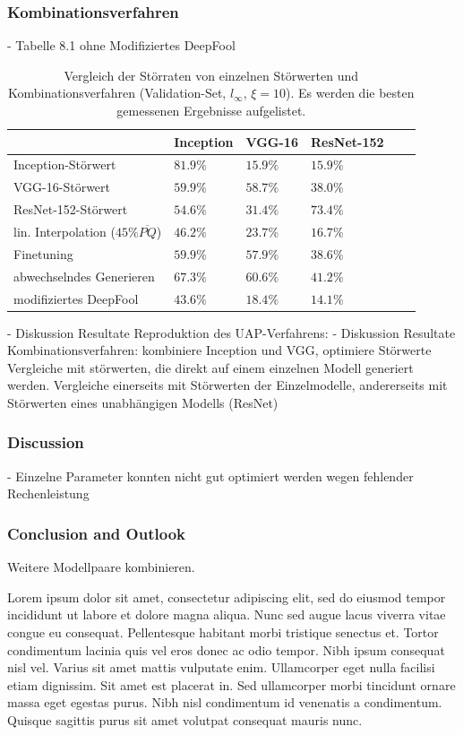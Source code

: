 \documentclass[runningheads]{llncs}
\begin{document}
\subsubsection{Kombinationsverfahren}
- Tabelle	8.1 ohne Modifiziertes DeepFool
\begin{table}[]
\centering
\caption{Vergleich der Störraten von einzelnen Störwerten und Kombinationsverfahren (Validation-Set, $l_\infty$, $\xi=10$). Es werden die besten gemessenen Ergebnisse aufgelistet.}
\begin{tabular}{|l|l|l|l|l|l|}
\hline

											&	Inception	&	VGG-16		&	ResNet-152		\\ \hline
Inception-Störwert							&	$81.9\%$		&	$15.9\%$	&	$15.9\%$		\\
VGG-16-Störwert								&	$59.9\%$		&	$58.7\%$	&	$38.0\%$		\\
ResNet-152-Störwert							&	$54.6\%$		&	$31.4\%$	&	$73.4\%$		\\ \hline
lin. Interpolation ($45\% \overline{PQ}$)	&	$46.2\%$		&	$23.7\%$	&	$16.7\%$		\\
Finetuning									&	$59.9\%$		&	$57.9\%$	&	$38.6\%$		\\
abwechselndes Generieren						&	$67.3\%$		&	$60.6\%$	&	$41.2\%$		\\
modifiziertes DeepFool						&	$43.6\%$		&	$18.4\%$	&	$14.1\%$		\\


\hline 
\end{tabular}
\label{tbl_vergleich_comb}
\end{table}
- Diskussion Resultate Reproduktion des UAP-Verfahrens: 
- Diskussion Resultate Kombinationsverfahren: kombiniere Inception und VGG, optimiere Störwerte
Vergleiche mit störwerten, die direkt auf einem einzelnen Modell generiert werden. Vergleiche einerseits mit Störwerten der Einzelmodelle, andererseits mit Störwerten eines unabhängigen Modells (ResNet)

\subsubsection{Discussion}
- Einzelne Parameter konnten nicht gut optimiert werden wegen fehlender Rechenleistung
\subsubsection{Conclusion and Outlook}
Weitere Modellpaare kombinieren.


Lorem ipsum dolor sit amet, consectetur adipiscing elit, sed do eiusmod tempor incididunt ut labore et dolore magna aliqua. Nunc sed augue lacus viverra vitae congue eu consequat. Pellentesque habitant morbi tristique senectus et. Tortor condimentum lacinia quis vel eros donec ac odio tempor. Nibh ipsum consequat nisl vel. Varius sit amet mattis vulputate enim. Ullamcorper eget nulla facilisi etiam dignissim. Sit amet est placerat in. Sed ullamcorper morbi tincidunt ornare massa eget egestas purus. Nibh nisl condimentum id venenatis a condimentum. Quisque sagittis purus sit amet volutpat consequat mauris nunc.
\end{document}
